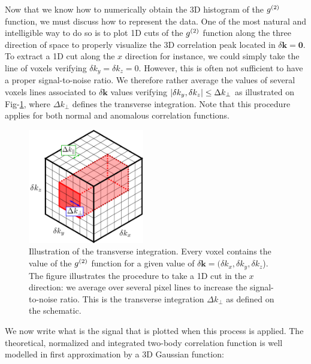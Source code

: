\label{sec:transverse_integration}

Now that we know how to numerically obtain the 3D histogram of the $g^{(2)}$ function, we must discuss how to represent the data. One of the most natural and intelligible way to do so is to plot 1D cuts of the $g^{(2)}$ function along the three direction of space to properly visualize the 3D correlation peak located in $\delta \bm{k} = \bm{0}$. To extract a 1D cut along the $x$ direction for instance, we could simply take the line of voxels verifying $\delta k_y=\delta k_z =0$. However, this is often not sufficient to have a proper signal-to-noise ratio. We therefore rather average the values of several voxels lines associated to $\delta \bm{k}$ values verifying $\left\lvert\delta k_y, \delta k_z\right\rvert \leq \Delta k_{\perp}$ as illustrated on Fig-\ref{fig:cube_integration}, where $\Delta k_{\perp}$ defines the transverse integration. Note that this procedure applies for both normal and anomalous correlation functions.

\begin{figure}
    \centering
    \includegraphics[width=0.45\textwidth]{Fig/Chapter4/cube_integration.png}
    \caption[Illustration of the transverse integration]{Illustration of the transverse integration. Every voxel contains the value of the $g^{(2)}$ function for a given value of $\delta \bm{k}=(\delta k_x, \delta k_y, \delta k_z$). The figure illustrates the procedure to take a 1D cut in the $x$ direction: we average over several pixel lines to increase the signal-to-noise ratio. This is the transverse integration $\Delta k_{\perp}$ as defined on the schematic.}
    \label{fig:cube_integration}
\end{figure}

We now write what is the signal that is plotted when this process is applied. The theoretical, normalized and integrated two-body correlation function is well modelled in first approximation by a 3D Gaussian function:


